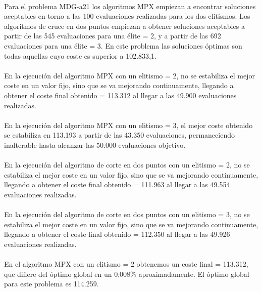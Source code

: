 	\paragraph{}Para el problema MDG-a21 los algoritmos MPX empiezan a encontrar soluciones aceptables en torno a las 100 evaluaciones realizadas para los dos elitismos. Los algoritmos de cruce en dos puntos empiezan a obtener soluciones aceptables a partir de las 545 evaluaciones para una élite = 2, y a partir de las 692 evaluaciones para una élite = 3. En este problema las soluciones óptimas son todas aquellas cuyo coste es superior a 102.833,1.
	
	\paragraph{}En la ejecución del algoritmo MPX con un elitismo = 2, no se estabiliza el mejor coste en un valor fijo, sino que se va mejorando continuamente, llegando a obtener el coste final obtenido = 113.312 al llegar a las 49.900 evaluaciones realizadas.
	
	\paragraph{}En la ejecución del algoritmo MPX con un elitismo = 3, el mejor coste obtenido se estabiliza en 113.193 a partir de las 43.350 evaluaciones, permaneciendo inalterable hasta alcanzar las 50.000 evaluaciones objetivo.
	
	\paragraph{}En la ejecución del algoritmo de corte en dos puntos con un elitismo = 2, no se estabiliza el mejor coste en un valor fijo, sino que se va mejorando continuamente, llegando a obtener el coste final obtenido = 111.963 al llegar a las 49.554 evaluaciones realizadas.
	
	\paragraph{}En la ejecución del algoritmo de corte en dos puntos con un elitismo = 3, no se estabiliza el mejor coste en un valor fijo, sino que se va mejorando continuamente, llegando a obtener el coste final obtenido = 112.350 al llegar a las 49.926 evaluaciones realizadas.
	
	\paragraph{}En el algoritmo MPX con un elitismo = 2 obtenemos un coste final = 113.312, que difiere del óptimo global en un 0,008\% aproximadamente. El óptimo global para este problema es 114.259.
	
